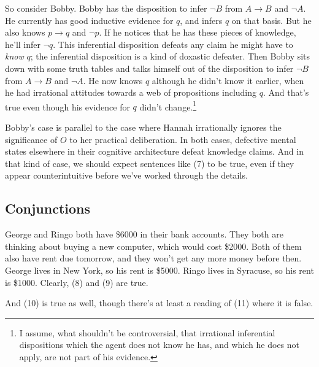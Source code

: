 So consider Bobby. Bobby has the disposition to infer $\neg B$ from $A \rightarrow B$ and $\neg A$. He currently has good inductive evidence for $q$, and infers $q$ on that basis. But he also knows $p \rightarrow q$ and $\neg p$. If he notices that he has these pieces of knowledge, he'll infer $\neg q$. This inferential disposition defeats any claim he might have to \textit{know} $q$; the inferential disposition is a kind of doxastic defeater. Then Bobby sits down with some truth tables and talks himself out of the disposition to infer $\neg B$ from $A \rightarrow B$ and $\neg A$. He now knows $q$ although he didn't know it earlier, when he had irrational attitudes towards a web of propositions including $q$. And that's true even though his evidence for $q$ didn't change.\footnote{I assume, what shouldn't be controversial, that irrational inferential dispositions which the agent does not know he has, and which he does not apply, are not part of his evidence.} 

Bobby's case is parallel to the case where Hannah irrationally ignores the significance of $O$ to her practical deliberation. In both cases, defective mental states elsewhere in their cognitive architecture defeat knowledge claims. And in that kind of case, we should expect sentences like (7) to be true, even if they appear counterintuitive before we've worked through the details.

\subsection{Conjunctions}
\noindent George and Ringo both have \$6000 in their bank accounts. They both are thinking about buying a new computer, which would cost \$2000. Both of them also have rent due tomorrow, and they won't get any more money before then. George lives in New York, so his rent is \$5000. Ringo lives in Syracuse, so his rent is \$1000. Clearly, (8) and (9) are true.


\noindent And (10) is true as well, though there's at least a reading of (11) where it is false.


